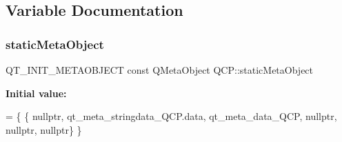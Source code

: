\subsection{Variable Documentation}
\mbox{\label{namespace_q_c_p_a008dd45af485c9312cac95d800c68ce1}} 
\subsubsection{\texorpdfstring{static\+Meta\+Object}{staticMetaObject}}
{\footnotesize\ttfamily Q\+T\+\_\+\+I\+N\+I\+T\+\_\+\+M\+E\+T\+A\+O\+B\+J\+E\+CT const Q\+Meta\+Object Q\+C\+P\+::static\+Meta\+Object}

{\bfseries Initial value\+:}
\begin{DoxyCode}
= \{
    \{ \textcolor{keyword}{nullptr}, qt\_meta\_stringdata\_QCP.data,
      qt\_meta\_data\_QCP,  \textcolor{keyword}{nullptr}, \textcolor{keyword}{nullptr}, \textcolor{keyword}{nullptr}\}
\}
\end{DoxyCode}

